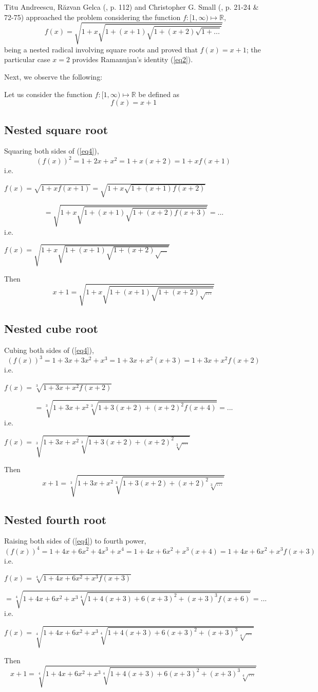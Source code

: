 \documentclass[runningheads]{llncs}
\begin{document}
Titu Andreescu, Răzvan Gelca (\cite{Andree}, p. 112) and Christopher G. Small (\cite{Small}, p. 21-24 \& 72-75) approached the problem considering the function $ f: {[1,\infty)} \mapsto \mathbb{R} $,
\begin{equation} \label{eq3}
f(x) = \sqrt{1+x\sqrt{1+(x+1)\sqrt{1+(x+2)\sqrt{1+...}}}}
\end{equation}
being a nested radical involving square roots and proved that $ f(x)= x+1 $; the particular case $x=2$ provides Ramanujan's identity (\ref{eq2}).


Next, we observe the following:

Let us consider the function $ f: {[1,\infty)} \mapsto \mathbb{R} $ be defined as 
\begin{equation} \label{eq4}
f(x)=x+1
\end{equation}
\subsection{Nested square root}
Squaring both sides of (\ref{eq4}),
\[ (f(x))^2 = 1+2x+x^2 = 1+x(x+2) = 1+xf(x+1) \]
i.e. \centerline{ $ f(x) = \sqrt{ 1+xf(x+1) } 
= \sqrt{1+x\sqrt{1+(x+1)f(x+2)}} $ }
\[ = \sqrt{1+x\sqrt{1+(x+1)\sqrt{1+(x+2)f(x+3)}}} = ... \] 
i.e. \centerline{ $ f(x) = \sqrt{1+x\sqrt{1+(x+1)\sqrt{1+(x+2)\sqrt{...}}}} $ }
Then
\begin{equation} \label{eq5}
x+1 = \sqrt{1+x\sqrt{1+(x+1)\sqrt{1+(x+2)\sqrt{...}}}}
\end{equation}
\subsection{Nested cube root}
Cubing both sides of (\ref{eq4}),
\[ (f(x))^3 = 1+3x+3x^2+x^3 = 1+3x+x^2(x+3) = 1+3x+x^2f(x+2) \]
i.e. \centerline{ $ f(x) = \sqrt[3]{1+3x+x^2f(x+2)} $}
\[ = \sqrt[3]{1+3x+x^2\sqrt[3]{1+3(x+2)+(x+2)^2f(x+4)}} = ... \] 
i.e. \centerline{ $ f(x) = \sqrt[3]{1+3x+x^2\sqrt[3]{1+3(x+2)+(x+2)^2\sqrt[3]{...}}} $ }
Then
\begin{equation} \label{eq6}
x+1 = \sqrt[3]{1+3x+x^2\sqrt[3]{1+3(x+2)+(x+2)^2\sqrt[3]{...}}}
\end{equation}
\subsection{Nested fourth root}
Raising both sides of (\ref{eq4}) to fourth power, 
\[ (f(x))^4 = 1+4x+6x^2+4x^3+x^4 = 1+4x+6x^2+x^3(x+4) = 1+4x+6x^2+x^3f(x+3) \]
i.e. \centerline{ $ f(x) = \sqrt[4]{1+4x+6x^2+x^3f(x+3)} $}
\[ = \sqrt[4]{1+4x+6x^2+x^3\sqrt[4]{1+4(x+3)+6(x+3)^2+(x+3)^3f(x+6)}} = ... \] 
i.e. \centerline{ $ f(x)= \sqrt[4]{1+4x+6x^2+x^3\sqrt[4]{1+4(x+3)+6(x+3)^2+(x+3)^3\sqrt[4]{...}}} $ }
Then
\begin{equation} \label{eq7}
x+1= \sqrt[4]{1+4x+6x^2+x^3\sqrt[4]{1+4(x+3)+6(x+3)^2+(x+3)^3\sqrt[4]{...}}}
\end{equation}
\end{document}

